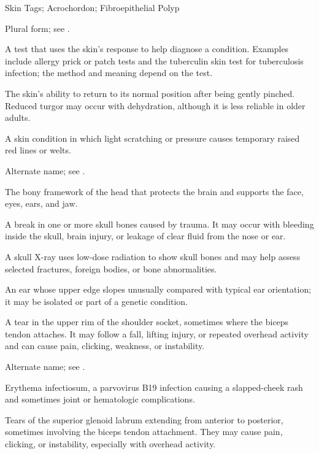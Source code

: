 \synonyms
Skin Tags; Acrochordon; Fibroepithelial Polyp

 Plural form; see .

 A test that uses the skin's response to help diagnose a condition. Examples include allergy prick or patch tests and the tuberculin skin test for tuberculosis infection; the method and meaning depend on the test.

 The skin's ability to return to its normal position after being gently pinched. Reduced turgor may occur with dehydration, although it is less reliable in older adults.

 A skin condition in which light scratching or pressure causes temporary raised red lines or welts.

 Alternate name; see .

 The bony framework of the head that protects the brain and supports the face, eyes, ears, and jaw.

 A break in one or more skull bones caused by trauma. It may occur with bleeding inside the skull, brain injury, or leakage of clear fluid from the nose or ear.

 A skull X-ray uses low-dose radiation to show skull bones and may help assess selected fractures, foreign bodies, or bone abnormalities.

 An ear whose upper edge slopes unusually compared with typical ear orientation; it may be isolated or part of a genetic condition.

 A tear in the upper rim of the shoulder socket, sometimes where the biceps tendon attaches. It may follow a fall, lifting injury, or repeated overhead activity and can cause pain, clicking, weakness, or instability.

 Alternate name; see .

 Erythema infectiosum, a parvovirus B19 infection causing a slapped-cheek rash and sometimes joint or hematologic complications.

 Tears of the superior glenoid labrum extending from anterior to posterior, sometimes involving the
biceps tendon attachment. They may cause pain, clicking, or instability, especially with overhead activity.

